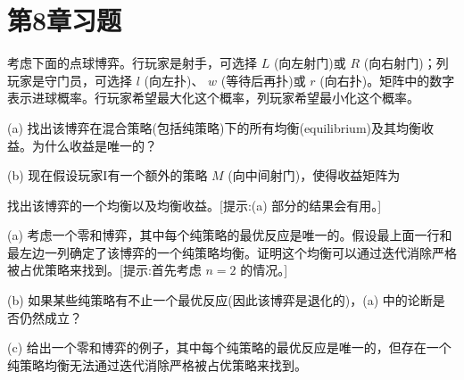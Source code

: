 \section{第8章习题}\label{sec:8.7}
\begin{exercise}\label{exer:8.1}
 考虑下面的点球博弈。行玩家是射手，可选择 \(L\) (向左射门)或 \(R\) (向右射门)；列玩家是守门员，可选择 \(l\) (向左扑)、 \(w\) (等待后再扑)或 \(r\) (向右扑)。矩阵中的数字表示进球概率。行玩家希望最大化这个概率，列玩家希望最小化这个概率。
\begin{center}
\end{center}

(a) 找出该博弈在混合策略(包括纯策略)下的所有均衡(equilibrium)及其均衡收益。为什么收益是唯一的？

(b) 现在假设玩家I有一个额外的策略 \(M\) (向中间射门)，使得收益矩阵为

\begin{center}
\end{center}

找出该博弈的一个均衡以及均衡收益。[提示:(a) 部分的结果会有用。]
\end{exercise}

\begin{exercise}\label{exer:8.2}
(a) 考虑一个零和博弈，其中每个纯策略的最优反应是唯一的。假设最上面一行和最左边一列确定了该博弈的一个纯策略均衡。证明这个均衡可以通过迭代消除严格被占优策略来找到。[提示:首先考虑 \(n = 2\) 的情况。]

(b) 如果某些纯策略有不止一个最优反应(因此该博弈是退化的)，(a) 中的论断是否仍然成立？

(c) 给出一个零和博弈的例子，其中每个纯策略的最优反应是唯一的，但存在一个纯策略均衡无法通过迭代消除严格被占优策略来找到。
\end{exercise}

